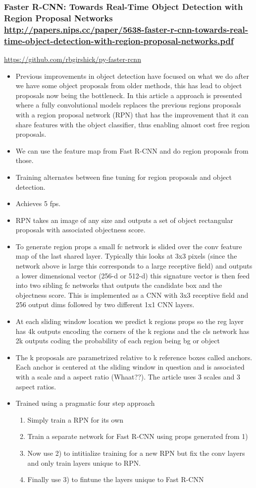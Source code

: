 \documentclass[11pt]{article}
\begin{document}
\subsubsection{Faster R-CNN: Towards Real-Time Object Detection with Region Proposal Networks \url{http://papers.nips.cc/paper/5638-faster-r-cnn-towards-real-time-object-detection-with-region-proposal-networks.pdf}}
\label{sec:org41bafea}
\url{https://github.com/rbgirshick/py-faster-rcnn}
\begin{itemize}
\item Previous improvements in object detection have focused on what we do after we have some object proposals from older methods, this has lead to object proposals now being the bottleneck. In this article a approach is presented where a fully convolutional models replaces the previous regions proposals with a region proposal network (RPN) that has the improvement that it can share features with the object classifier, thus enabling almost cost free region proposals.
\item We can use the feature map from Fast R-CNN and do region proposals from those.
\item Training alternates between fine tuning for region proposals and object detection.
\item Achieves 5 fps.
\item RPN takes an image of any size and outputs a set of object rectangular proposals with associated objectness score.
\item To generate region props a small fc network is slided over the conv feature map of the last shared layer. Typically this looks at 3x3 pixels (since the network above is large this corresponds to a large receptive field) and outputs a lower dimensional vector (256-d or 512-d) this signature vector is then feed into two sibling fc networks that outputs the candidate box and the objectness score. This is implemented as a CNN with 3x3 receptive field and 256 output dims followed by two different 1x1 CNN layers.
\item At each sliding window location we predict k regions props so the reg layer has 4k outputs encoding the corners of the k regions and the cls network has 2k outputs coding the probability of each region being bg or object
\item The k proposals are parametrized relative to k reference boxes called anchors. Each anchor is centered at the sliding window in question and is associated with a scale and a aspect ratio (Whaat??). The article uses 3 scales and 3 aspect ratios.
\item Trained using a pragmatic four step approach
\begin{enumerate}
\item Simply train a RPN for its own
\item Train a separate network for Fast R-CNN using props generated from 1)
\item Now use 2) to intitialize training for a new RPN but fix the conv layers and only train layers unique to RPN.
\item Finally use 3) to fintune the layers unique to Fast R-CNN
\end{enumerate}
\end{itemize}
\end{document}
